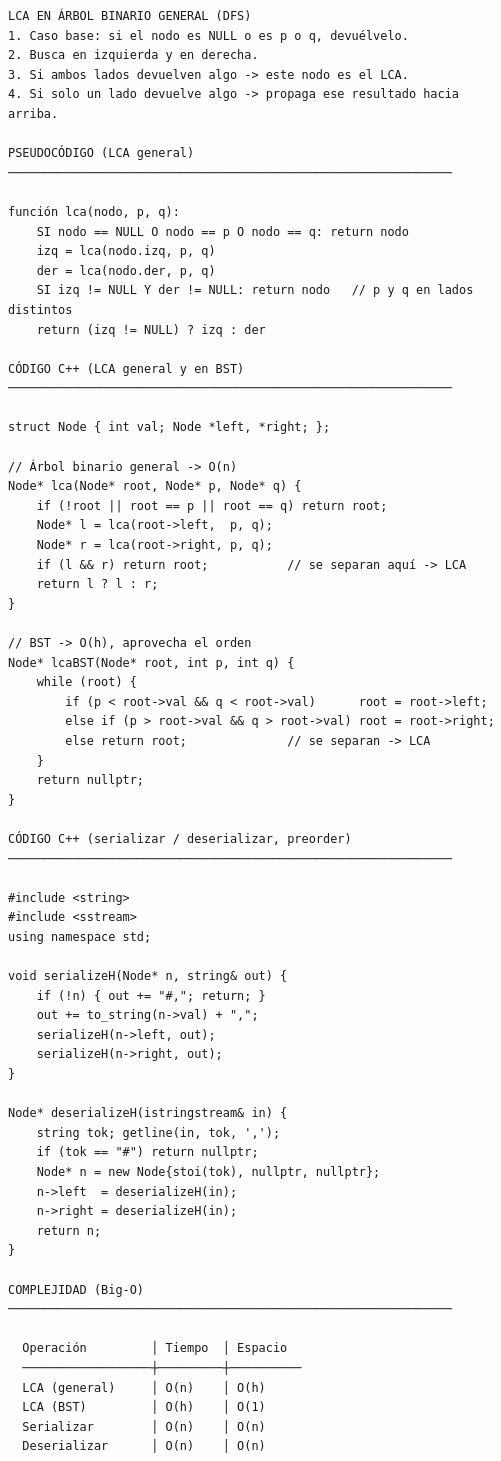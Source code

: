 \begin{lstlisting}
LCA EN ÁRBOL BINARIO GENERAL (DFS)
1. Caso base: si el nodo es NULL o es p o q, devuélvelo.
2. Busca en izquierda y en derecha.
3. Si ambos lados devuelven algo -> este nodo es el LCA.
4. Si solo un lado devuelve algo -> propaga ese resultado hacia arriba.

PSEUDOCÓDIGO (LCA general)
──────────────────────────────────────────────────────────────

función lca(nodo, p, q):
    SI nodo == NULL O nodo == p O nodo == q: return nodo
    izq = lca(nodo.izq, p, q)
    der = lca(nodo.der, p, q)
    SI izq != NULL Y der != NULL: return nodo   // p y q en lados distintos
    return (izq != NULL) ? izq : der

CÓDIGO C++ (LCA general y en BST)
──────────────────────────────────────────────────────────────

struct Node { int val; Node *left, *right; };

// Árbol binario general -> O(n)
Node* lca(Node* root, Node* p, Node* q) {
    if (!root || root == p || root == q) return root;
    Node* l = lca(root->left,  p, q);
    Node* r = lca(root->right, p, q);
    if (l && r) return root;           // se separan aquí -> LCA
    return l ? l : r;
}

// BST -> O(h), aprovecha el orden
Node* lcaBST(Node* root, int p, int q) {
    while (root) {
        if (p < root->val && q < root->val)      root = root->left;
        else if (p > root->val && q > root->val) root = root->right;
        else return root;              // se separan -> LCA
    }
    return nullptr;
}

CÓDIGO C++ (serializar / deserializar, preorder)
──────────────────────────────────────────────────────────────

#include <string>
#include <sstream>
using namespace std;

void serializeH(Node* n, string& out) {
    if (!n) { out += "#,"; return; }
    out += to_string(n->val) + ",";
    serializeH(n->left, out);
    serializeH(n->right, out);
}

Node* deserializeH(istringstream& in) {
    string tok; getline(in, tok, ',');
    if (tok == "#") return nullptr;
    Node* n = new Node{stoi(tok), nullptr, nullptr};
    n->left  = deserializeH(in);
    n->right = deserializeH(in);
    return n;
}

COMPLEJIDAD (Big-O)
──────────────────────────────────────────────────────────────

  Operación         │ Tiempo  │ Espacio
  ──────────────────┼─────────┼──────────
  LCA (general)     │ O(n)    │ O(h)
  LCA (BST)         │ O(h)    │ O(1)
  Serializar        │ O(n)    │ O(n)
  Deserializar      │ O(n)    │ O(n)
\end{lstlisting}

